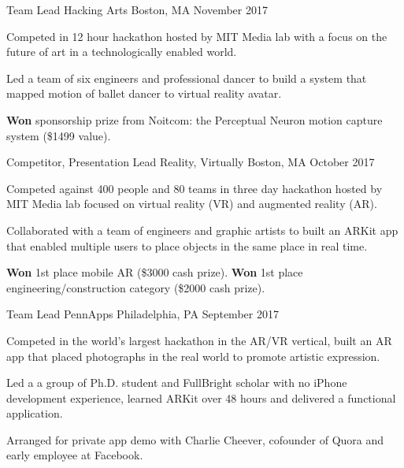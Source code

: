 \begin{cventries}
  \cventry
    {Team Lead}
    {Hacking Arts}
    {Boston, MA}
    {November 2017}
    {
      \begin{cvitems}
        \item {Competed in 12 hour hackathon hosted by MIT Media lab with a focus on the future of art in a technologically enabled world.}
        \item {Led a team of six engineers and professional dancer to build a system that mapped motion of ballet dancer to virtual reality avatar.}
        \item{\textbf{Won} sponsorship prize from Noitcom: the Perceptual Neuron motion capture system (\$1499 value).}
      \end{cvitems}
    }
% 
  \cventry
    {Competitor, Presentation Lead}
    {Reality, Virtually}
    {Boston, MA}
    {October 2017}
    {
      \begin{cvitems}
        \item {Competed against 400 people and 80 teams in three day hackathon hosted by MIT Media lab focused on virtual reality (VR) and augmented reality (AR).}
        \item {Collaborated with a team of engineers and graphic artists to built an ARKit app that enabled multiple users to place objects in the same place in real time.}
        \item {\textbf{Won} 1st place mobile AR (\$3000 cash prize). \textbf{Won} 1st place engineering/construction category (\$2000 cash prize).}
      \end{cvitems}
    }
% 
  \cventry
    {Team Lead}
    {PennApps}
    {Philadelphia, PA}
    {September 2017}
    {
      \begin{cvitems}
        \item {Competed in the world’s largest hackathon in the AR/VR vertical, built an AR app that placed photographs in the real world to promote artistic expression.}
        \item {Led a a group of Ph.D. student and FullBright scholar with no iPhone development experience, learned ARKit over 48 hours and delivered a functional application.}
        \item {Arranged for private app demo with Charlie Cheever, cofounder of Quora and early employee at Facebook.}
      \end{cvitems}
    }
\end{cventries}
